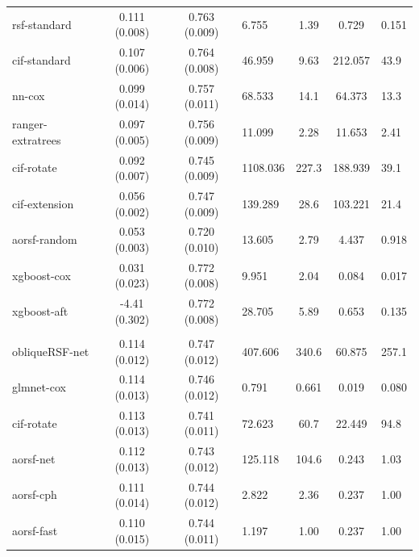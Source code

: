 \documentclass[twoside,11pt]{article}\usepackage[]{graphicx}\usepackage[]{xcolor}
\newenvironment{knitrout}{}{} %
\begin{document}
\begin{knitrout}
\begin{longtable}{lcclccl}
\hspace{1em}rsf-standard & 0.111 (0.008) & 0.763 (0.009) & 6.755 & 1.39 & 0.729 & 0.151\\
\hspace{1em}cif-standard & 0.107 (0.006) & 0.764 (0.008) & 46.959 & 9.63 & 212.057 & 43.9\\
\hspace{1em}nn-cox & 0.099 (0.014) & 0.757 (0.011) & 68.533 & 14.1 & 64.373 & 13.3\\
\hspace{1em}ranger-extratrees & 0.097 (0.005) & 0.756 (0.009) & 11.099 & 2.28 & 11.653 & 2.41\\
\hspace{1em}cif-rotate & 0.092 (0.007) & 0.745 (0.009) & 1108.036 & 227.3 & 188.939 & 39.1\\
\hspace{1em}cif-extension & 0.056 (0.002) & 0.747 (0.009) & 139.289 & 28.6 & 103.221 & 21.4\\
\hspace{1em}aorsf-random & 0.053 (0.003) & 0.720 (0.010) & 13.605 & 2.79 & 4.437 & 0.918\\
\hspace{1em}xgboost-cox & 0.031 (0.023) & 0.772 (0.008) & 9.951 & 2.04 & 0.084 & 0.017\\
\hspace{1em}xgboost-aft & -4.41 (0.302) & 0.772 (0.008) & 28.705 & 5.89 & 0.653 & 0.135\\
\addlinespace[0.3em]
\hline
\multicolumn{7}{l}{\textit{\textbf{Systolic Heart Failure; death, n = 2231, p = 41}}}\\
\hline
\hspace{1em}obliqueRSF-net & 0.114 (0.012) & 0.747 (0.012) & 407.606 & 340.6 & 60.875 & 257.1\\
\hspace{1em}glmnet-cox & 0.114 (0.013) & 0.746 (0.012) & 0.791 & 0.661 & 0.019 & 0.080\\
\hspace{1em}cif-rotate & 0.113 (0.013) & 0.741 (0.011) & 72.623 & 60.7 & 22.449 & 94.8\\
\hspace{1em}aorsf-net & 0.112 (0.013) & 0.743 (0.012) & 125.118 & 104.6 & 0.243 & 1.03\\
\hspace{1em}aorsf-cph & 0.111 (0.014) & 0.744 (0.012) & 2.822 & 2.36 & 0.237 & 1.00\\
\hspace{1em}aorsf-fast & 0.110 (0.015) & 0.744 (0.011) & 1.197 & 1.00 & 0.237 & 1.00\\

\end{longtable}
\end{knitrout}
\end{document}
